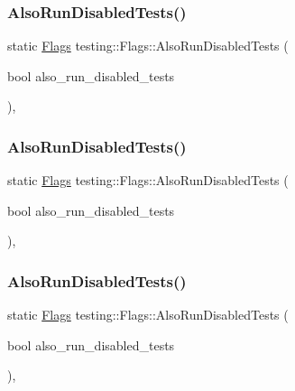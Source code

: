 \subsubsection{\texorpdfstring{AlsoRunDisabledTests()}{AlsoRunDisabledTests()}\hspace{0.1cm}{\footnotesize\ttfamily [1/3]}}
{\footnotesize\ttfamily static \mbox{\hyperlink{structtesting_1_1_flags}{Flags}} testing\+::\+Flags\+::\+Also\+Run\+Disabled\+Tests (\begin{DoxyParamCaption}\item[{bool}]{also\+\_\+run\+\_\+disabled\+\_\+tests }\end{DoxyParamCaption})\hspace{0.3cm}{\ttfamily [inline]}, {\ttfamily [static]}}

\mbox{\label{structtesting_1_1_flags_a8bee2b5f94d8248b6791d6b005db146f}} 
\subsubsection{\texorpdfstring{AlsoRunDisabledTests()}{AlsoRunDisabledTests()}\hspace{0.1cm}{\footnotesize\ttfamily [2/3]}}
{\footnotesize\ttfamily static \mbox{\hyperlink{structtesting_1_1_flags}{Flags}} testing\+::\+Flags\+::\+Also\+Run\+Disabled\+Tests (\begin{DoxyParamCaption}\item[{bool}]{also\+\_\+run\+\_\+disabled\+\_\+tests }\end{DoxyParamCaption})\hspace{0.3cm}{\ttfamily [inline]}, {\ttfamily [static]}}

\mbox{\label{structtesting_1_1_flags_a8bee2b5f94d8248b6791d6b005db146f}} 
\subsubsection{\texorpdfstring{AlsoRunDisabledTests()}{AlsoRunDisabledTests()}\hspace{0.1cm}{\footnotesize\ttfamily [3/3]}}
{\footnotesize\ttfamily static \mbox{\hyperlink{structtesting_1_1_flags}{Flags}} testing\+::\+Flags\+::\+Also\+Run\+Disabled\+Tests (\begin{DoxyParamCaption}\item[{bool}]{also\+\_\+run\+\_\+disabled\+\_\+tests }\end{DoxyParamCaption})\hspace{0.3cm}{\ttfamily [inline]}, {\ttfamily [static]}}


